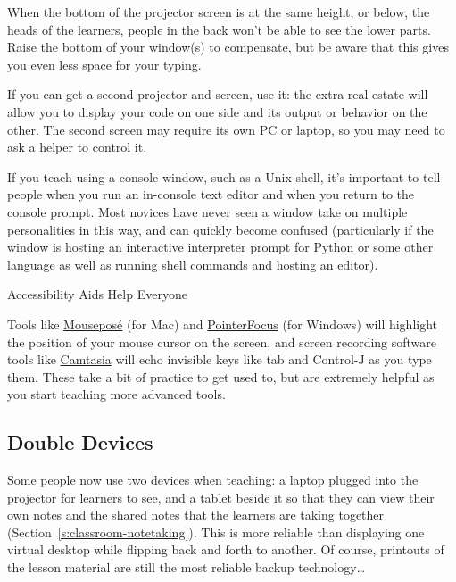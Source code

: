 When the bottom of the projector screen is at the same height, or below,
the heads of the learners, people in the back won't be able to see the
lower parts. Raise the bottom of your window(s) to compensate, but be
aware that this gives you even less space for your typing.

If you can get a second projector and screen, use it: the extra real
estate will allow you to display your code on one side and its output or
behavior on the other. The second screen may require its own PC or
laptop, so you may need to ask a helper to control it.

If you teach using a console window, such as a Unix shell, it's
important to tell people when you run an in-console text editor and when
you return to the console prompt. Most novices have never seen a window
take on multiple personalities in this way, and can quickly become
confused (particularly if the window is hosting an interactive
interpreter prompt for Python or some other language as well as running
shell commands and hosting an editor).

\begin{aside}{Accessibility Aids Help Everyone}

Tools like \href{https://boinx.com/mousepose/overview/}{Mousepos\'{e}} (for Mac) and
\href{http://www.pointerfocus.com/}{PointerFocus} (for Windows) will highlight the
position of your mouse cursor on the screen, and screen recording
software tools like \href{https://www.techsmith.com/video-editor.html}{Camtasia} will echo invisible keys
like tab and Control-J as you type them. These take a bit of
practice to get used to, but are extremely helpful as you start
teaching more advanced tools.

\end{aside}

\subsection*{Double Devices}

Some people now use two devices when teaching: a laptop plugged into the
projector for learners to see, and a tablet beside it so that they can
view their own notes and the shared notes that the learners are taking
together (Section~\ref{s:classroom-notetaking}). This is more reliable
than displaying one virtual desktop while flipping back and forth to
another. Of course, printouts of the lesson material are still the most
reliable backup technology{\ldots}

